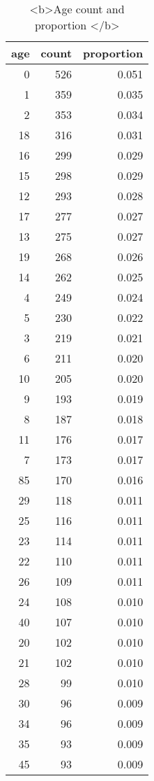 \documentclass[
]{article}
\begin{document}
\begin{table}

\caption{\label{tab:unnamed-chunk-58}<b>Age count and proportion </b>}
\centering
\begin{tabular}[t]{r|r|r}
\hline
age & count & proportion\\
\hline
0 & 526 & 0.051\\
\hline
1 & 359 & 0.035\\
\hline
2 & 353 & 0.034\\
\hline
18 & 316 & 0.031\\
\hline
16 & 299 & 0.029\\
\hline
15 & 298 & 0.029\\
\hline
12 & 293 & 0.028\\
\hline
17 & 277 & 0.027\\
\hline
13 & 275 & 0.027\\
\hline
19 & 268 & 0.026\\
\hline
14 & 262 & 0.025\\
\hline
4 & 249 & 0.024\\
\hline
5 & 230 & 0.022\\
\hline
3 & 219 & 0.021\\
\hline
6 & 211 & 0.020\\
\hline
10 & 205 & 0.020\\
\hline
9 & 193 & 0.019\\
\hline
8 & 187 & 0.018\\
\hline
11 & 176 & 0.017\\
\hline
7 & 173 & 0.017\\
\hline
85 & 170 & 0.016\\
\hline
29 & 118 & 0.011\\
\hline
25 & 116 & 0.011\\
\hline
23 & 114 & 0.011\\
\hline
22 & 110 & 0.011\\
\hline
26 & 109 & 0.011\\
\hline
24 & 108 & 0.010\\
\hline
40 & 107 & 0.010\\
\hline
20 & 102 & 0.010\\
\hline
21 & 102 & 0.010\\
\hline
28 & 99 & 0.010\\
\hline
30 & 96 & 0.009\\
\hline
34 & 96 & 0.009\\
\hline
35 & 93 & 0.009\\
\hline
45 & 93 & 0.009\\

\end{tabular}
\end{table}
\end{document}
